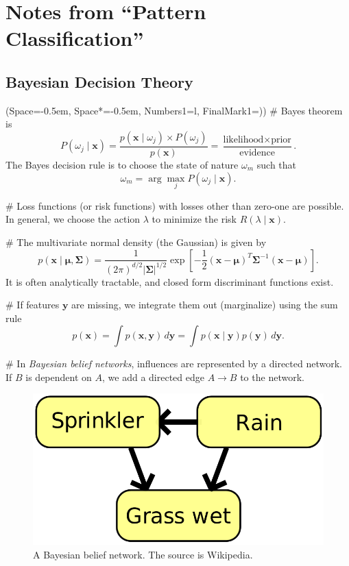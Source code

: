 \documentclass[12pt, a4paper]{article}
\newcommand{\listSpace}{-0.5em}%
\newcommand{\vect}[1]{\bm{#1}}
\newcommand{\abs}[1]{\left\lvert#1\right\rvert}
\begin{document}
\clearpage
\tableofcontents
\clearpage
\section{Notes from ``Pattern Classification''}
\setcounter{subsection}{1}
\subsection{Bayesian Decision Theory}
\begin{easylist}[itemize]
\ListProperties(Space=\listSpace, Space*=\listSpace, Numbers1=l, FinalMark1={)})
# Bayes theorem is
\begin{equation*}
	P(\omega_j \mid \vect{x}) = \frac{p(\vect{x} \mid \omega_j) \times P(\omega_j)}{p(\vect{x})}
	= \frac{\text{likelihood} \times \text{prior}}{\text{evidence}}.
\end{equation*}
The Bayes decision rule is to choose the state of nature $\omega_m$ such that
\begin{equation*}
	\omega_m = \arg \max_j P(\omega_j \mid \vect{x}).
\end{equation*}

# Loss functions (or risk functions) with losses other than zero-one are possible.
 In general, we choose the action $\lambda$ to minimize the risk $R(\lambda \mid \vect{x})$.
 
# The multivariate normal density (the Gaussian) is given by
\begin{equation*}
	p(\vect{x} \mid \vect{\mu}, \vect{\Sigma}) = \frac{1}{(2 \pi)^{d/2} \abs{\vect{\Sigma}}^{1/2}} 
	\exp \left[ - \frac{1}{2} 
	\left( \vect{x} - \vect{\mu} \right)^T \vect{\Sigma}^{-1} 
	\left( \vect{x} - \vect{\mu} \right) \right].
\end{equation*}
It is often analytically tractable, and closed form discriminant functions exist.

# If features $\vect{y}$ are missing, we integrate them out (marginalize) using the sum rule
\begin{equation*}
	p(\vect{x}) = \int p(\vect{x}, \vect{y}) \, d\vect{y} = \int p(\vect{x} \mid \vect{y}) p(\vect{y}) \, d\vect{y}.
\end{equation*}

# In \emph{Bayesian belief networks}, influences are represented by a directed network.
If $B$ is dependent on $A$, we add a directed edge $A \to B$ to the network.
\end{easylist}
\begin{figure}[ht!]
\centering
\includegraphics[width=0.3\linewidth]{figs/bayesian_belief_network}
\caption{A Bayesian belief network. The source is Wikipedia.}
\label{fig:bayesian_belief_network}
\end{figure}
\end{document}

